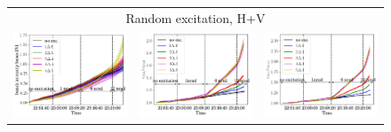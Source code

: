 \documentclass[
prstab
,reprint
,linenumbers
,longbibliography
,preprintnumbers
,showkeys
,amsfonts,amssymb,amsmath
,floatfix
]{revtex4-1}
\newlength{\thirdwidth}
\begin{document}
\begin{figure}
\begin{tabular}{ccc}
    \multicolumn{3}{c}{Random excitation, H+V} \\
    \includegraphics[width=\thirdwidth]{2017_bunch_intensity_hvran_no_damper_avg.png} &
    \includegraphics[width=\thirdwidth]{2017_emith_avg_rel_hvran_no_damper.png} &
    \includegraphics[width=\thirdwidth]{2017_emitv_avg_rel_hvran_no_damper.png}\\

\end{tabular}
\end{figure}
\end{document}
